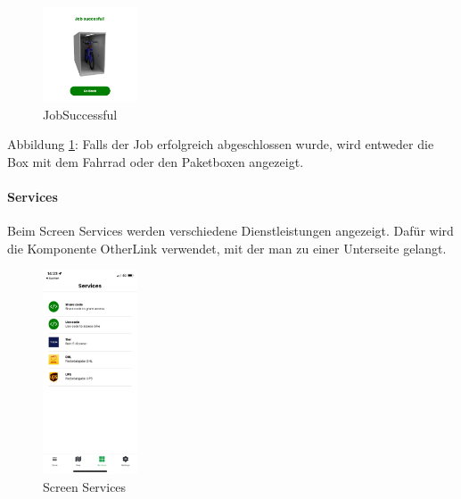 \begin{figure}[H]
  \centering
  \includegraphics[width=0.25\textwidth]{images/app-screenshots/succes.png}
  \caption{JobSuccessful}
  \label{fig:success}
\end{figure}
Abbildung \ref{fig:success}: Falls der Job erfolgreich abgeschlossen wurde, wird entweder die Box mit dem Fahrrad oder den Paketboxen angezeigt.\\

\paragraph{Services}Beim Screen Services werden verschiedene Dienstleistungen angezeigt. Dafür wird die Komponente OtherLink verwendet, mit der man zu einer Unterseite gelangt.\\
\begin{figure}[H]
  \centering
  \includegraphics[width=0.25\textwidth]{images/app-screenshots/screenservices.png}
  \caption{Screen Services}
  \label{fig:screenservices}
\end{figure}


